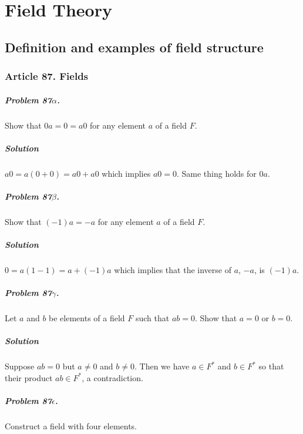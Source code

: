 \chapter{Field Theory}

\section{Definition and examples of field structure}


\subsection{Article 87. Fields}

\paragraph{Problem 87$\alpha$.}
Show that $0a = 0 = a0$ for any element $a$ of a field $F$.

\paragraph*{Solution}
$a0 = a (0 + 0) = a0 + a0$ which implies $a0 = 0$. Same thing holds for $0a$.

\paragraph{Problem 87$\beta$.}
Show that $(-1)a = -a$ for any element $a$ of a field $F$.

\paragraph*{Solution}
$0 = a(1-1) = a + (-1)a$ which implies that the inverse of $a$, $-a$, is
$(-1)a$.

\paragraph{Problem 87$\gamma$.}
Let $a$ and $b$ be elements of a field $F$ such that $ab = 0$. Show that
$a=0$ or $b=0$.

\paragraph*{Solution}
Suppose $ab = 0$ but $a \neq 0$ and $b \neq 0$. Then we have $ a \in F^*$ and
$ b \in F^*$ so that their product $ab \in F^*$, a contradiction.

\paragraph{Problem 87$\epsilon$.}
Construct a field with four elements.

